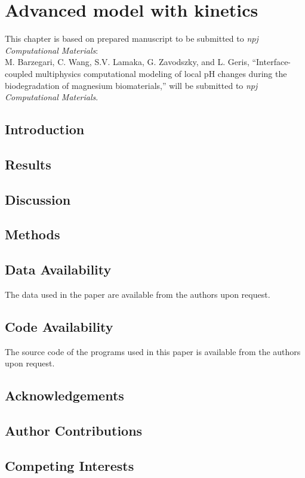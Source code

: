 \chapter{Advanced model with kinetics}\label{ch:kinetics}


\begin{shaded}
This chapter is based on prepared manuscript to be submitted to  \textit{npj Computational Materials}:\\
M. Barzegari, C. Wang, S.V. Lamaka, G. Zavodszky, and L. Geris, ``Interface-coupled multiphysics computational modeling of local pH changes during the biodegradation of magnesium biomaterials,'' will be submitted to \textit{npj Computational Materials}.
\end{shaded}

\section{Introduction}

\section{Results}

\section{Discussion}

\section{Methods}

\section{Data Availability}

The data used in the paper are available from the authors upon request.

\section{Code Availability}
The source code of the programs used in this paper is available from the authors upon request.


\section{Acknowledgements}

\section{Author Contributions}

\section{Competing Interests}


\cleardoublepage

